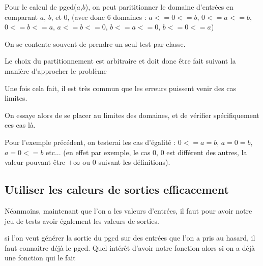 \begin{example}
	Pour le calcul de pgcd($a$,$b$), on peut parititionner le domaine d'entrées en comparant $a$, $b$, et $0$, (avec donc 6 domaines : $a <= 0 <= b$, $0 <= a <= b$, $0 <= b <= a$, $a <= b <= 0$, $b <= a <= 0$, $b <= 0 <= a$)
\end{example}

\begin{rem}
	On se contente souvent de prendre un seul test par classe.
\end{rem}

\begin{rem}
	Le choix du partitionnement est arbitraire et doit donc être fait suivant la manière d'approcher le problème
\end{rem}


Une fois cela fait, il est très commun que les erreurs puissent venir des cas limites. 

\begin{principe}
	On essaye alors de se placer au limites des domaines, et de vérifier spécifiquement ces cas là.
\end{principe}

\begin{example}
	Pour l'exemple précédent, on testerai les cas d'égalité : $0 <= a = b$, $a = 0 = b$, $a  = 0 <= b$ etc... (en effet par exemple, le cas 0, 0 est différent des autres, la valeur pouvant être $+\infty$ ou $0$ suivant les définitions).
\end{example}

\subsection{Utiliser les caleurs de sorties efficacement}

Néanmoins, maintenant que l'on a les valeurs d'entrées, il faut pour avoir notre jeu de tests avoir également les valeurs de sorties.

\begin{example}
	si l'on veut générer la sortie du pgcd sur des entrées que l'on a pris au hasard, il faut connaitre déjà le pgcd. Quel intérêt d'avoir notre fonction alors si on a déjà une fonction qui le fait
\end{example}

